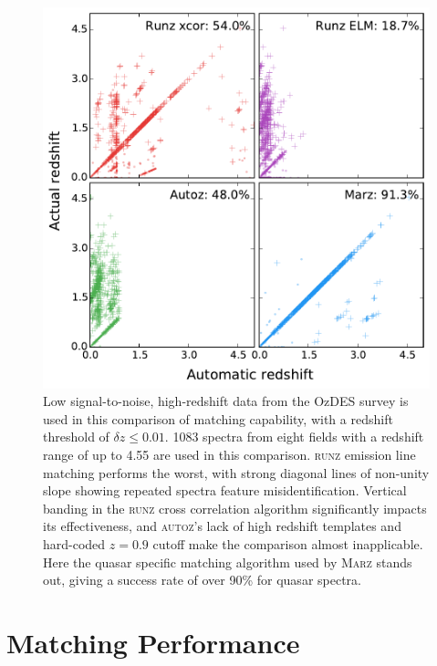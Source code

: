 \documentclass[iop]{emulateapj}
\newcommand{\runz}{\textsc{runz}}
\newcommand{\autoz}{\textsc{autoz}}
\newcommand{\marz}{\textsc{Marz}}
\begin{document}
\begin{figure}[t]
\centering
\includegraphics[width=\columnwidth]{run009Comp.pdf}
\caption{Low signal-to-noise, high-redshift data from the OzDES survey is used in this comparison of matching capability, with a redshift threshold of $\delta z \leq 0.01$. 1083 spectra from eight fields with a redshift range of up to 4.55 are used in this comparison. \runz{} emission line matching performs the worst, with strong diagonal lines of non-unity slope showing repeated spectra feature misidentification. Vertical banding in the \runz{} cross correlation algorithm significantly impacts its effectiveness, and \autoz{}'s lack of high redshift templates and hard-coded $z=0.9$ cutoff make the comparison almost inapplicable. Here the quasar specific matching algorithm used by \marz{} stands out, giving a success rate of over 90\% for quasar spectra.}
\label{fig:low}
\end{figure}





\section{Matching Performance}
\end{document}
